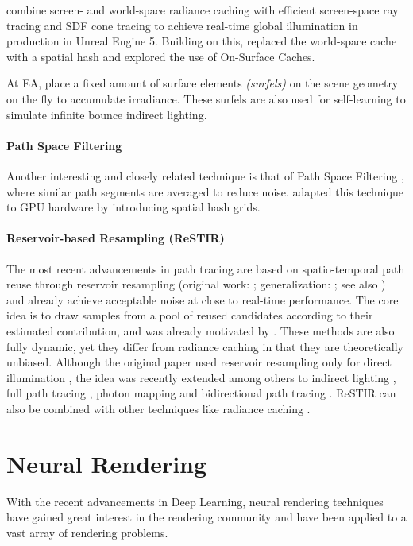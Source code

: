 \textcite{wright2021,wright2022} combine screen- and world-space radiance caching with efficient screen-space ray tracing and SDF cone tracing to achieve real-time global illumination in production in Unreal Engine 5.
Building on this, \textcite{boisse2023} replaced the world-space cache with a spatial hash and \textcite{tatzgern2024} explored the use of On-Surface Caches.

At EA, \textcite{stachowiak2018,halen2021,apers2024} place a fixed amount of surface elements \textit{(surfels)} on the scene geometry on the fly to accumulate irradiance.
These surfels are also used for self-learning to simulate infinite bounce indirect lighting.

\paragraph{Path Space Filtering}
Another interesting and closely related technique is that of Path Space Filtering , where similar path segments are averaged to reduce noise.
\textcite{binder2021} adapted this technique to GPU hardware by introducing spatial hash grids.

\paragraph{Reservoir-based Resampling (ReSTIR)}
The most recent advancements in path tracing are based on spatio-temporal path reuse through reservoir resampling (original work: \cite{bitterli2020}; generalization: \cite{lin2022}; see also \cite{wyman2023}) and already achieve acceptable noise at close to real-time performance.
The core idea is to draw samples from a pool of reused candidates according to their estimated contribution, and was already motivated by \textcite{talbot2005}.
These methods are also fully dynamic, yet they differ from radiance caching in that they are theoretically unbiased.
Although the original paper used reservoir resampling only for direct illumination , the idea was recently extended among others to indirect lighting , full path tracing , photon mapping  and bidirectional path tracing .
ReSTIR can also be combined with other techniques like radiance caching .

\section{Neural Rendering}
With the recent advancements in Deep Learning, neural rendering techniques have gained great interest in the rendering community and have been applied to a vast array of rendering problems.

